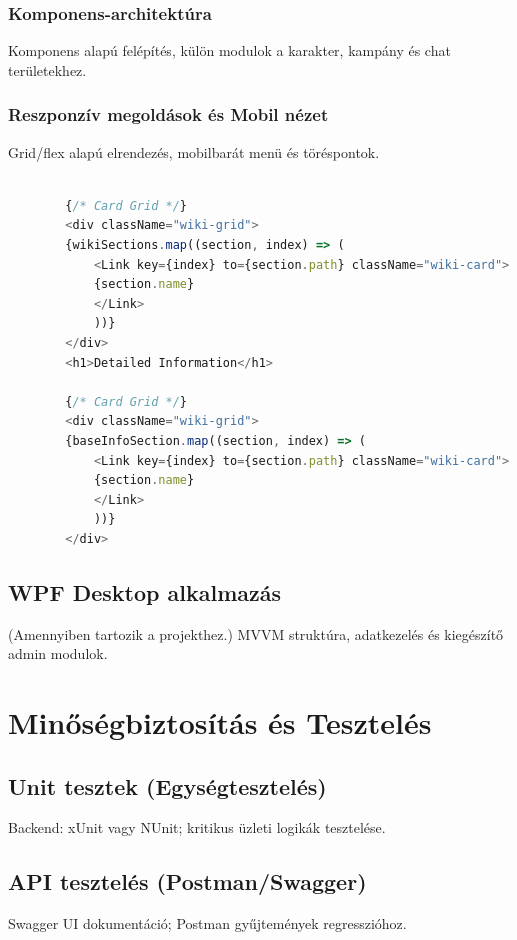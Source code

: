 \documentclass[colorlinks]{thesis-kando}
\theoremstyle{definition}
\theoremstyle{remark}
\begin{document}
	\subsection{Komponens-architektúra}
	Komponens alapú felépítés, külön modulok a karakter, kampány és chat területekhez.
	
	\subsection{Reszponzív megoldások és Mobil nézet}
	Grid/flex alapú elrendezés, mobilbarát menü és töréspontok.
	
	\begin{lstlisting}[language=JavaScript,caption={Példa React komponens}]
		
		{/* Card Grid */}
		<div className="wiki-grid">
		{wikiSections.map((section, index) => (
			<Link key={index} to={section.path} className="wiki-card">
			{section.name}
			</Link>
			))}
		</div>
		<h1>Detailed Information</h1>
		
		{/* Card Grid */}
		<div className="wiki-grid">
		{baseInfoSection.map((section, index) => (
			<Link key={index} to={section.path} className="wiki-card">
			{section.name}
			</Link>
			))}
		</div>
	\end{lstlisting}
	
	\section{WPF Desktop alkalmazás}
	(Amennyiben tartozik a projekthez.) MVVM struktúra, adatkezelés és kiegészítő admin modulok.
	
	\chapter{Minőségbiztosítás és Tesztelés}
	
	\section{Unit tesztek (Egységtesztelés)}
	Backend: xUnit vagy NUnit; kritikus üzleti logikák tesztelése.
	
	\section{API tesztelés (Postman/Swagger)}
	Swagger UI dokumentáció; Postman gyűjtemények regresszióhoz.
	
\end{document}
